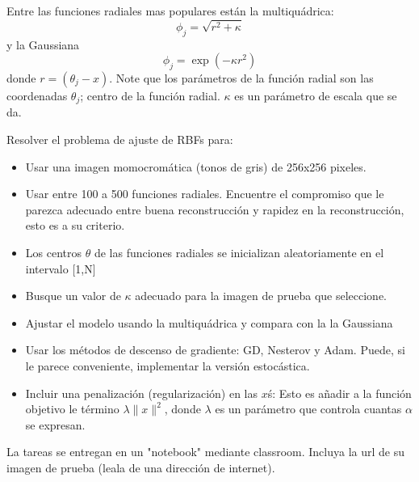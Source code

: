 \documentclass{article}
\begin{document}
Entre las funciones radiales mas populares están la multiquádrica:
\begin{equation}
    \label{eq:MQ}
    \phi_j = \sqrt{r^2  + \kappa }
\end{equation}
y la Gaussiana
\begin{equation}
    \label{eq:MQ}
    \phi_j = \exp{(-\kappa r^2)}
\end{equation}
donde $r = (\theta_{j} - x).$ Note que los parámetros de la función radial son las coordenadas $\theta_j$; centro de la función radial. $\kappa$ es un parámetro de escala que se da.

Resolver el problema de ajuste de RBFs para:

\begin{itemize}
    \item Usar una imagen momocromática (tonos de gris) de 256x256 pixeles.

    \item Usar entre 100 a 500 funciones radiales. Encuentre el compromiso que le parezca adecuado entre buena reconstrucción y rapidez en la reconstrucción, esto es a su criterio.

    \item Los centros $\theta$ de las funciones radiales se inicializan aleatoriamente en el intervalo [1,N]


    \item Busque un valor de $\kappa$ adecuado para la imagen de prueba que seleccione.
     
    \item Ajustar el modelo usando la multiquádrica y compara con la la Gaussiana

    \item Usar los métodos de descenso de gradiente: GD, Nesterov y Adam. Puede, si le parece conveniente, implementar la versión estocástica.

    \item Incluir una penalización (regularización) en las $x$\'s: Esto es añadir a la función objetivo le término $\lambda \|x\|^2$, donde $\lambda$ es un parámetro que controla cuantas $\alpha$ se expresan.    

\end{itemize}


{\bf} La tareas se entregan en un "notebook" mediante classroom. Incluya la url de su imagen de prueba (leala de una dirección de internet).
\end{document}
